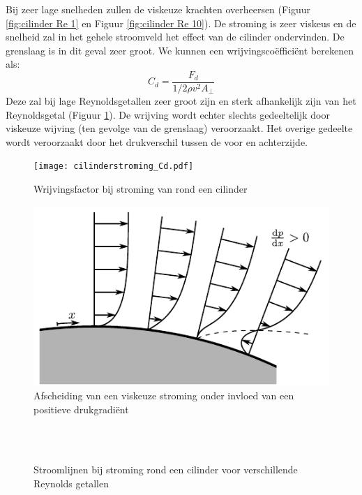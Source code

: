 Bij zeer lage snelheden zullen de viskeuze krachten overheersen (Figuur \ref{fig:cilinder Re 1} en Figuur \ref{fig:cilinder Re 10}). De stroming is zeer viskeus en de snelheid zal in het gehele stroomveld het effect van de cilinder ondervinden. De grenslaag is in dit geval zeer groot.
We kunnen een wrijvingscoëfficiënt berekenen als:
\begin{equation}
	C_d = \frac{F_d}{1/2 \rho v^2 A_{\perp}}
	\label{eqn:wrijvingscoefficient}
\end{equation}
Deze zal bij lage Reynoldsgetallen zeer groot zijn en sterk afhankelijk zijn van het Reynoldsgetal (Figuur \ref{fig:cilinderstroming_cd}). De wrijving wordt echter slechts gedeeltelijk door viskeuze wijving (ten gevolge van de grenslaag) veroorzaakt. Het overige gedeelte wordt veroorzaakt door het drukverschil tussen de voor en achterzijde.
\begin{figure}[htb]
	\centering
	\texttt{[image: cilinderstroming\_Cd.pdf]}
	\caption{Wrijvingsfactor bij stroming van rond een cilinder }
	\label{fig:cilinderstroming_cd}
\end{figure}
\begin{figure}[htb]
	\centering
	\includegraphics{fig/uitwendige_stroming/loshechting}
	\caption{Afscheiding van een viskeuze stroming onder invloed van een positieve drukgradiënt}
	\label{fig:afscheiding}
\end{figure}
\begin{figure}[htb]
	\centering
	 \quad
	\\
	 \quad
	\\
	\caption{Stroomlijnen bij stroming rond een cilinder voor verschillende Reynolds getallen}
	\label{fig:Sroomlijnen bij stroming rond een cilinder}
\end{figure}

